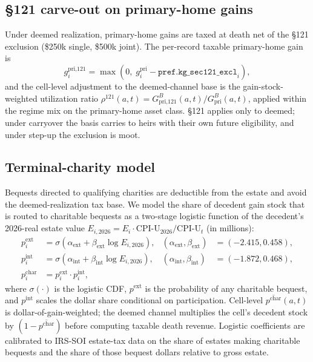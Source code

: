 \documentclass[11pt]{article}
\begin{document}
\subsection{\S{121} carve-out on primary-home gains}
\label{app:121}

Under deemed realization, primary-home gains are taxed at death net of the
\S{121} exclusion (\$250k single, \$500k joint). The per-record taxable
primary-home gain is
\begin{equation}
g^{\text{pri,121}}_{i} = \max\!\left(0,\; g^{\text{pri}}_{i}
                                     - \texttt{pref.kg\_sec121\_excl}_{i}\right),
\end{equation}
and the cell-level adjustment to the deemed-channel base is the
gain-stock-weighted utilization ratio
$\rho^{121}(a,t) = G^B_{\text{pri,121}}(a,t) / G^B_{\text{pri}}(a,t)$,
applied within the regime mix on the primary-home asset class. \S{121}
applies only to deemed; under carryover the basis carries to heirs with
their own future eligibility, and under step-up the exclusion is moot.

\subsection{Terminal-charity model}
\label{app:charity}

Bequests directed to qualifying charities are deductible from the estate
and avoid the deemed-realization tax base. We model the share of decedent
gain stock that is routed to charitable bequests as a two-stage logistic
function of the decedent's 2026-real estate value
$E_{i, 2026} = E_i \cdot \mathrm{CPI\text{-}U}_{2026} / \mathrm{CPI\text{-}U}_{t}$
(in millions):
\begin{align}
p^{\text{ext}}_i  &= \sigma(\alpha_{\text{ext}}
                          + \beta_{\text{ext}}\log E_{i, 2026}),
                          & (\alpha_{\text{ext}}, \beta_{\text{ext}}) &= (-2.415, 0.458),\\
p^{\text{int}}_i  &= \sigma(\alpha_{\text{int}}
                          + \beta_{\text{int}}\log E_{i, 2026}),
                          & (\alpha_{\text{int}}, \beta_{\text{int}}) &= (-1.872, 0.468),\\
p^{\text{char}}_i &= p^{\text{ext}}_i \cdot p^{\text{int}}_i,
\end{align}
where $\sigma(\cdot)$ is the logistic CDF, $p^{\text{ext}}$ is the
probability of any charitable bequest, and $p^{\text{int}}$ scales the
dollar share conditional on participation. Cell-level
$\overline{p^{\text{char}}}(a,t)$ is dollar-of-gain-weighted; the deemed
channel multiplies the cell's decedent stock by
$(1 - \overline{p^{\text{char}}})$ before computing taxable death revenue.
Logistic coefficients are calibrated to IRS-SOI estate-tax data on the
share of estates making charitable bequests and the share of those bequest
dollars relative to gross estate.
\end{document}
